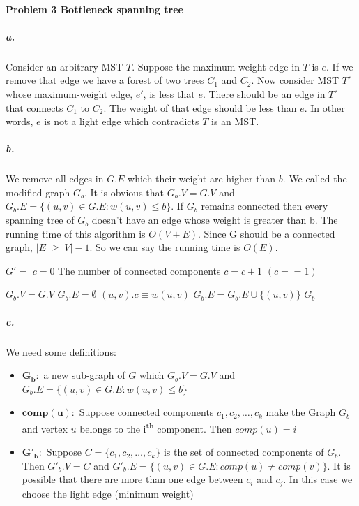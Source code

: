 \documentclass{book}
\begin{document}
	\paragraph{Problem 3 Bottleneck spanning tree}
	\subparagraph{a.}
	Consider an arbitrary MST $T$. Suppose the maximum-weight edge in $T$ is $e$. If we remove that edge we have a forest of two trees $C_1$ and $C_2$. Now consider MST $T'$ whose maximum-weight edge, $e'$, is less that $e$. There should be an edge in $T'$ that connects $C_1$ to $C_2$. The weight of that edge should be less than $e$. In other words, $e$ is not a light edge which contradicts $T$ is an MST.
	\subparagraph{b.}
	We remove all edges in $G.E$ which their weight are higher than $b$. We called the modified graph $G_b$. It is obvious that $G_b.V = G.V$ and $G_b.E = \{(u, v) \in G.E : w(u, v) \le b\}$. If $G_b$ remains connected then every spanning tree of $G_b$ doesn't have an edge whose weight is greater than b. The running time of this algorithm is $O(V + E)$. Since G should be a connected graph, $|E| \ge |V| - 1$. So we can say the running time is $O(E)$.
	\begin{algorithm*}[h!]
		\begin{algorithmic}[1]
				\State $G' = $ 
				\State {}
				\State $c = 0$ \Comment The number of connected components
						\State $c = c + 1$
						\State {}
					\EndIf
				\EndFor
				\State \Return $(c == 1)$
			\EndFunction
		\end{algorithmic}
	\end{algorithm*}
	\begin{algorithm*}[h!]
		\begin{algorithmic}[1]
				\State $G_b.V = G.V$
				\State $G_b.E = \emptyset$
					 \Comment $(u, v).c \equiv w(u, v)$
						\State $G_b.E = G_b.E \cup \{(u, v)\}$
					\EndIf					
				\EndFor
				\State \Return $G_b$
			\EndFunction
		\end{algorithmic}
	\end{algorithm*}		
	\FloatBarrier
	\subparagraph{c.}
	We need some definitions:
	\begin{itemize}
		\item $\boldsymbol{G_b:}$ a new sub-graph of $G$ which $G_b.V = G.V$ and $G_b.E = \{(u, v) \in G.E : w(u, v) \le b\}$
		\item $\boldsymbol{comp(u):}$ Suppose connected components $c_1, c_2, \dots, c_k$ make the Graph $G_b$ and vertex $u$ belongs to the i\textsuperscript{th} component. Then $comp(u) = i$
		\item $\boldsymbol{G'_b:}$ Suppose $C = \{c_1, c_2, \dots, c_k\}$ is the set of connected components of $G_b$. Then $G'_b.V = C$ and $G'_b.E = \{(u, v) \in G.E : comp(u) \ne comp(v)\}$. It is possible that there are more than one edge between $c_i$ and $c_j$. In this case we choose the light edge (minimum weight)
	\end{itemize}
\end{document}
